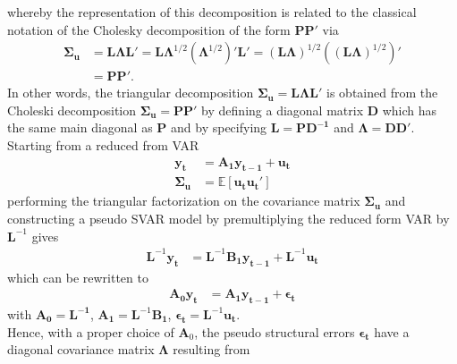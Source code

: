 \documentclass[a4paper,11pt,listof=nochaptergap,oneside,pointednumbers,bibtotoc,bigheadings,liststotoc]{scrbook}
\theoremstyle{mysatz}
\theoremstyle{mydefinition}
\theoremstyle{mybemerkung}
\newcommand{\vect}[1]{\boldsymbol{\mathbf{#1}}}
\begin{document}
whereby the representation of this decomposition is related to the classical notation of the Cholesky decomposition of the form $\vect{PP'}$ via
\begin{equation} \label{eq:svar17}
\begin{split}
	\vect{\Sigma_u} & = \vect{L}\vect{\Lambda}\vect{L}' = \vect{L}\vect{\Lambda}^{1/2}(\vect{\Lambda}^{1/2})'\vect{L}' = (\vect{L}\vect{\Lambda})^{1/2}\left ( (\vect{L}\vect{\Lambda})^{1/2}\right )' \\
				& = \vect{P}\vect{P'}.
\end{split}								
\end{equation}
In other words, the triangular decomposition $\vect{\Sigma_u} = \vect{L}\vect{\Lambda}\vect{L'}$ is obtained from the Choleski decomposition $\vect{\Sigma_u} = \vect{P}\vect{P'}$ by defining a diagonal matrix $\vect{D}$ which has the same main diagonal as $\vect{P}$ and by specifying $\vect{L} = \vect{P}\vect{D^{-1}}$ and $\vect{\Lambda} = \vect{D}\vect{D'}$.\\
Starting from a reduced from VAR
\begin{equation} \label{eq:svar18}
\begin{split}
	\vect{y_t} & = \vect{A_1}\vect{y_{t-1}} + \vect{u_t} \\
	\vect{\Sigma_u} & = \mathbb{E}[\vect{u_t}\vect{u_t}']
\end{split}								
\end{equation}
performing the triangular factorization on the covariance matrix $\vect{\Sigma_u}$ and constructing a pseudo SVAR model by premultiplying the reduced form VAR by $\vect{L}^{-1}$ gives
\begin{equation} \label{eq:svar19}
\begin{split}
	\vect{L}^{-1}\vect{y_t} & = \vect{L}^{-1}\vect{B_1}\vect{y_{t-1}} + \vect{L}^{-1}\vect{u_t}
\end{split}								
\end{equation}
which can be rewritten to
\begin{equation} \label{eq:svar21}
\begin{split}
	\vect{A_0}\vect{y_t} & = \vect{A_1}\vect{y_{t-1}} + \vect{\epsilon_t}
\end{split}								
\end{equation}
with $\vect{A_0} = \vect{L^{-1}}$, $\vect{A_1} = \vect{L}^{-1}\vect{B_1}$, $\vect{\epsilon_t} = \vect{L}^{-1}\vect{u_t}$.\\
Hence, with a proper choice of $\vect{A}_0$, the pseudo structural errors $\vect{\epsilon_t}$ have a diagonal covariance matrix $\vect{\Lambda}$ resulting from 
\end{document}
